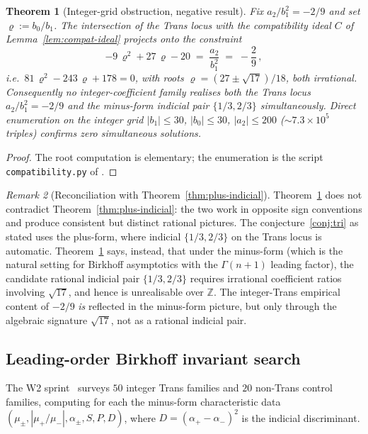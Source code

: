 \documentclass[11pt]{amsart}
\newtheorem{theorem}{Theorem}[section]
\theoremstyle{definition}
\theoremstyle{remark}
\newtheorem{remark}[theorem]{Remark}
\newcommand{\Z}{\mathbb{Z}}
\begin{document}
\begin{theorem}[Integer-grid obstruction, negative result]
\label{thm:integer-obstruction}
Fix $a_2/b_1^2 = -2/9$ and set $\varrho := b_0/b_1$.  The
intersection of the Trans locus with the compatibility ideal
$C$ of Lemma~\ref{lem:compat-ideal} projects onto the constraint
\[
  -9\,\varrho^2 + 27\,\varrho - 20 \;=\; \frac{a_2}{b_1^2}
  \;=\; -\frac{2}{9}\,,
\]
i.e.\ $81\,\varrho^2 - 243\,\varrho + 178 = 0$, with roots
$\varrho = (27 \pm \sqrt{17})/18$, both irrational.  Consequently no
integer-coefficient family realises both the Trans locus
$a_2/b_1^2 = -2/9$ and the minus-form indicial pair $\{1/3,2/3\}$
simultaneously.  Direct enumeration on the integer grid
$|b_1|\le 30$, $|b_0|\le 30$, $|a_2|\le 200$
($\sim 7.3\times 10^5$ triples) confirms zero simultaneous
solutions.
\end{theorem}
\begin{proof}
The root computation is elementary; the enumeration is the script
\texttt{compatibility.py} of \cite{SprintW1Report}.
\end{proof}

\begin{remark}[Reconciliation with Theorem~\ref{thm:plus-indicial}]
Theorem~\ref{thm:integer-obstruction} does not contradict
Theorem~\ref{thm:plus-indicial}: the two work in opposite sign
conventions and produce consistent but distinct rational pictures.
The conjecture~\ref{conj:tri} as stated uses the plus-form, where
indicial $\{1/3,2/3\}$ on the Trans locus is automatic.
Theorem~\ref{thm:integer-obstruction} says, instead, that under the
minus-form (which is the natural setting for Birkhoff
asymptotics with the $\Gamma(n+1)$ leading factor), the candidate
rational indicial pair $\{1/3,2/3\}$ requires irrational coefficient
ratios involving $\sqrt{17}$, and hence is unrealisable over $\Z$.
The integer-Trans empirical content of $-2/9$ \emph{is} reflected in
the minus-form picture, but only through the algebraic signature
$\sqrt{17}$, not as a rational indicial pair.
\end{remark}

\subsection{Leading-order Birkhoff invariant search}\label{sec:leading}

The W2 sprint~\cite{SprintW2Report} surveys $50$ integer Trans
families and $20$ non-Trans control families, computing for each
the minus-form characteristic data
$(\mu_\pm, |\mu_+/\mu_-|, \alpha_\pm, S, P, D)$, where
$D = (\alpha_+-\alpha_-)^2$ is the indicial discriminant.
\end{document}
